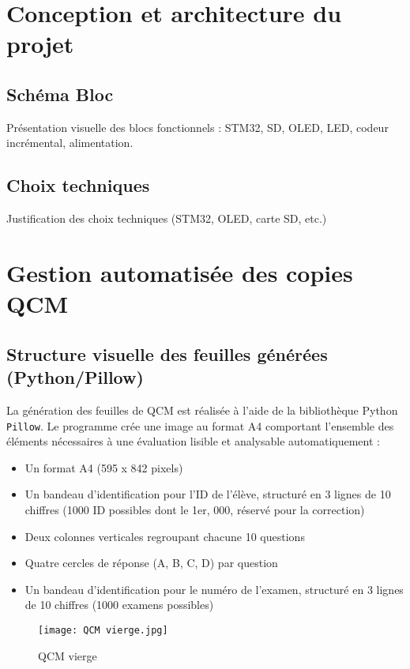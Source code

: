 \documentclass[a4paper,11pt]{article}
\begin{document}
\newpage
\section{Conception et architecture du projet}

\subsection{Schéma Bloc}
Présentation visuelle des blocs fonctionnels : STM32, SD, OLED, LED, codeur incrémental, alimentation.

\subsection{Choix techniques}
Justification des choix techniques (STM32, OLED, carte SD, etc.)

\newpage
\section{Gestion automatisée des copies QCM}

\subsection{Structure visuelle des feuilles générées (Python/Pillow)}
La génération des feuilles de QCM est réalisée à l’aide de la bibliothèque Python \texttt{Pillow}. Le programme crée une image au format A4 comportant l’ensemble des éléments nécessaires à une évaluation lisible et analysable automatiquement :
\begin{itemize}
    \item Un format A4 (595 x 842 pixels)
    \item Un bandeau d’identification pour l’ID de l’élève, structuré en 3 lignes de 10 chiffres (1000 ID possibles dont le 1er, 000, réservé pour la correction)
    \item Deux colonnes verticales regroupant chacune 10 questions
    \item Quatre cercles de réponse (A, B, C, D) par question
    \item Un bandeau d’identification pour le numéro de l’examen, structuré en 3 lignes de 10 chiffres (1000 examens possibles)
\end{itemize}

\begin{figure}[h!]
    \centering
    \texttt{[image: QCM vierge.jpg]}
    \caption{QCM vierge}
    \label{fig:qcmvierge}
\end{figure}
\end{document}
